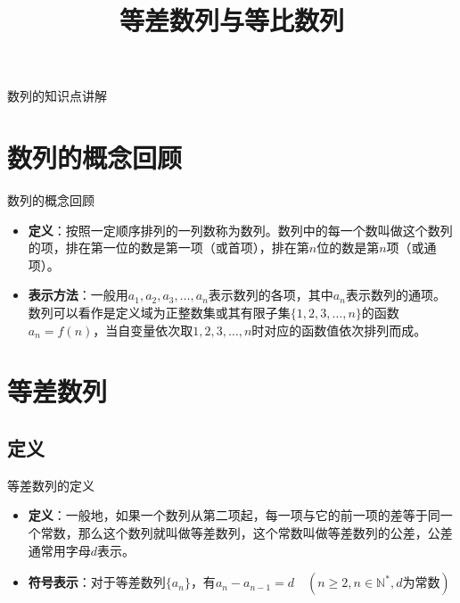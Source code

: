 \documentclass[aspectratio=169]{ctexbeamer} %
\begin{document}
\begin{frame}{数列的知识点讲解}
\title{等差数列与等比数列}
\titlepage
\end{frame}

\begin{frame}
\tableofcontents
\end{frame}

\section{数列的概念回顾}
\begin{frame}{数列的概念回顾}
\begin{itemize}
\item \textbf{定义}：按照一定顺序排列的一列数称为数列。数列中的每一个数叫做这个数列的项，排在第一位的数是第一项（或首项），排在第$n$位的数是第$n$项（或通项）。
\item \textbf{表示方法}：一般用$a_1, a_2, a_3, \dots, a_n$表示数列的各项，其中$a_n$表示数列的通项。数列可以看作是定义域为正整数集或其有限子集$\{1, 2, 3, \dots, n\}$的函数$a_n = f(n)$，当自变量依次取$1, 2, 3, \dots, n$时对应的函数值依次排列而成。
\end{itemize}
\end{frame}

\section{等差数列}
\subsection{定义}
\begin{frame}{等差数列的定义}
\begin{itemize}
\item \textbf{定义}：一般地，如果一个数列从第二项起，每一项与它的前一项的差等于同一个常数，那么这个数列就叫做等差数列，这个常数叫做等差数列的公差，公差通常用字母$d$表示。
\item \textbf{符号表示}：对于等差数列$\{a_n\}$，有$a_n - a_{n-1} = d\quad(n \geq 2, n \in \mathbb{N}^*, d\text{为常数})$
\end{itemize}
\end{frame}
\end{document}

